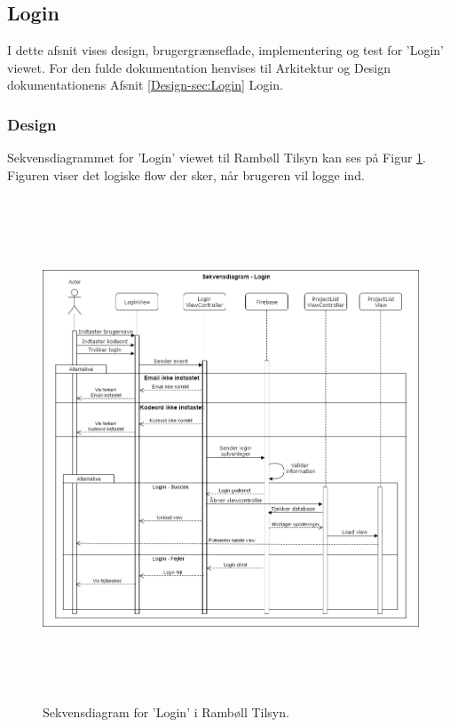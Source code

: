 \subsection{Login}
I dette afsnit vises design, brugergrænseflade, implementering og test for 'Login' viewet. For den fulde dokumentation henvises til Arkitektur og Design dokumentationens Afsnit \ref{Design-sec:Login} Login.
\subsubsection{Design}
Sekvensdiagrammet for 'Login' viewet til Rambøll Tilsyn kan ses på Figur \ref{fig:LoginSekvens}. Figuren viser det logiske flow der sker, når brugeren vil logge ind.
\begin{figure}[H] %
	\centering
	\includegraphics[height=15cm, width=15cm]{Design/Applikation/Login/LoginSekvensDiagram}
	\caption{Sekvensdiagram for 'Login' i Rambøll Tilsyn.}
	\label{fig:LoginSekvens}
\end{figure}

\clearpage

